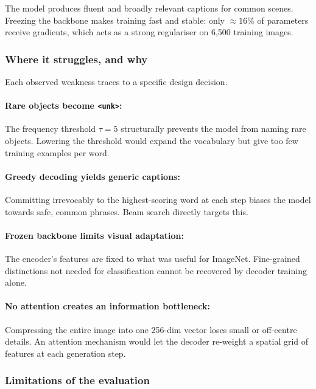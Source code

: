 \documentclass{article}
\begin{document}
The model produces fluent and broadly relevant captions for common scenes.
Freezing the backbone makes training fast and stable: only $\approx 16\%$ of
parameters receive gradients, which acts as a strong regulariser on 6{,}500
training images.

\subsubsection{Where it struggles, and why}

Each observed weakness traces to a specific design decision.

\paragraph{Rare objects become \texttt{<unk>}:}
The frequency threshold $\tau=5$ structurally prevents the model from naming
rare objects. Lowering the threshold would expand the vocabulary but give too
few training examples per word.

\paragraph{Greedy decoding yields generic captions:}
Committing irrevocably to the highest-scoring word at each step biases the model
towards safe, common phrases. Beam search directly targets this.

\paragraph{Frozen backbone limits visual adaptation:}
The encoder's features are fixed to what was useful for ImageNet. Fine-grained
distinctions not needed for classification cannot be recovered by decoder
training alone.

\paragraph{No attention creates an information bottleneck:}
Compressing the entire image into one 256-dim vector loses small or off-centre
details. An attention mechanism \citep{xu2015show} would let the decoder
re-weight a spatial grid of features at each generation step.

\subsubsection{Limitations of the evaluation}
\end{document}
